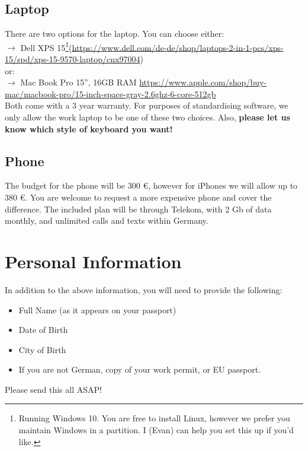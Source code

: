 \documentclass[11pt]{report}
\begin{document}
\subsection{Laptop}
There are two options for the laptop. You can choose either:\\
$\rightarrow$ Dell XPS 15\footnote{Running Windows 10. You are free to install Linux, however we prefer you maintain Windows in a partition. I (Evan) can help you set this up if you'd like.}{\tiny (\href{https://www.dell.com/de-de/shop/laptops-2-in-1-pcs/xps-15/spd/xps-15-9570-laptop/cnx97004}{https://www.dell.com/de-de/shop/laptops-2-in-1-pcs/xps-15/spd/xps-15-9570-laptop/cnx97004})}\\
or:\\
$\rightarrow$ Mac Book Pro 15'', 16GB RAM {\tiny \href{https://www.apple.com/shop/buy-mac/macbook-pro/15-inch-space-gray-2.6ghz-6-core-512gb}{https://www.apple.com/shop/buy-mac/macbook-pro/15-inch-space-gray-2.6ghz-6-core-512gb}}\\
Both come with a 3 year warranty. For purposes of standardising software, we only allow the work laptop to be one of these two choices. Also, {\bf please let us know which style of keyboard you want!}

\subsection{Phone}
The budget for the phone will be 300 \euro, however for iPhones we will allow up to 380 \euro. You are welcome to request a more expensive phone and cover the difference. The included plan will be through Telekom, with 2 Gb of data monthly, and unlimited calls and texts within Germany.

\section{Personal Information} \label{PersonalInformation}
In addition to the above information, you will need to provide the following:
\begin{itemize}
\item Full Name (as it appears on your passport)
\item Date of Birth
\item City of Birth
\item If you are not German, copy of your work permit, or EU passport.
\end{itemize}
Please send this all ASAP!
\end{document}
